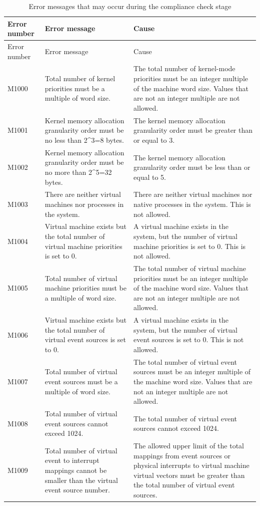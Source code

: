 \begin{xltabular}{\textwidth}{@{}>{\hsize\raggedright\arraybackslash}X>{\hsize\raggedright\arraybackslash}X>{\hsize\raggedright\arraybackslash}X@{}}
\caption{Error messages that may occur during the compliance check stage}\label{tab:5-20}\\
\toprule
Error number & Error message & Cause\tabularnewline
\endfirsthead
\toprule
Error number & Error message & Cause\tabularnewline
\midrule
\endhead
\bottomrule
\endlastfoot
M1000 & Total number of kernel priorities must be a multiple of word
size. &
The total number of kernel-mode priorities must be an integer multiple of the machine word size. Values that are not an integer multiple are not allowed.\tabularnewline
M1001 & Kernel memory allocation granularity order must be no less than
2\^{}3=8 bytes. & The kernel memory allocation granularity order must be greater than or equal to 3.\tabularnewline
M1002 & Kernel memory allocation granularity order must be no more than
2\^{}5=32 bytes. & The kernel memory allocation granularity order must be less than or equal to 5.\tabularnewline
M1003 & There are neither virtual machines nor processes in the system.
& There are neither virtual machines nor native processes in the system. This is not allowed.\tabularnewline
M1004 & Virtual machine exists but the total number of virtual machine
priorities is set to 0. &
A virtual machine exists in the system, but the number of virtual machine priorities is set to 0. This is not allowed.\tabularnewline
M1005 & Total number of virtual machine priorities must be a multiple of
word size. &
The total number of virtual machine priorities must be an integer multiple of the machine word size. Values that are not an integer multiple are not allowed.\tabularnewline
M1006 & Virtual machine exists but the total number of virtual event
sources is set to 0. &
A virtual machine exists in the system, but the number of virtual event sources is set to 0. This is not allowed.\tabularnewline
M1007 & Total number of virtual event sources must be a multiple of word
size. &
The total number of virtual event sources must be an integer multiple of the machine word size. Values that are not an integer multiple are not allowed.\tabularnewline
M1008 & Total number of virtual event sources cannot exceed 1024. &
The total number of virtual event sources cannot exceed 1024.\tabularnewline
M1009 & Total number of virtual event to interrupt mappings cannot be
smaller than the virtual event source number. &
The allowed upper limit of the total mappings from event sources or physical interrupts to virtual machine virtual vectors must be greater than the total number of virtual event sources.\tabularnewline

\end{xltabular}
